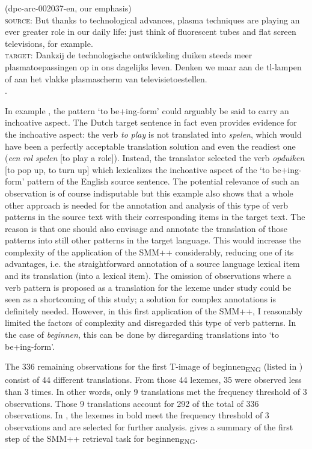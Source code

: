 \ea (dpc-arc-002037-en, our emphasis)\label{ex:3:4}\\
\textsc{source:} But thanks to technological advances, plasma techniques are playing an ever greater role in our daily life: just think of fluorescent tubes and flat screen televisions, for example.\\
\textsc{target:} Dankzij de technologische ontwikkeling duiken steeds meer plasmatoepassingen op in ons dagelijks leven. Denken we maar aan de tl-lampen of aan het vlakke plasmascherm van televisietoestellen.\\.
\z

In example , the pattern ‘to be+ing-form’ could arguably be said to carry an inchoative aspect. The Dutch target sentence in fact even provides evidence for the inchoative aspect: the verb \textit{to} \textit{play} is not translated into \textit{spelen}, which would have been a perfectly acceptable translation solution and even the readiest one (\textit{een} \textit{rol} \textit{spelen} [to play a role]). Instead, the translator selected the verb \textit{opduiken} [to pop up, to turn up] which lexicalizes the inchoative aspect of the ‘to be+ing-form’ pattern of the English source sentence. The potential relevance of such an observation is of course indisputable but this example also shows that a whole other approach is needed for the annotation and analysis of this type of verb patterns in the source text with their corresponding items in the target text. The reason is that one should also envisage and annotate the translation of those patterns into still other patterns in the target language. This would increase the complexity of the application of the SMM++ considerably, reducing one of its advantages, i.e. the straightforward annotation of a source language lexical item and its translation (into a lexical item). The omission of observations where a verb pattern is proposed as a translation for the lexeme under study could be seen as a shortcoming of this study; a solution for complex annotations is definitely needed. However, in this first application of the SMM++, I reasonably limited the factors of complexity and disregarded this type of verb patterns. In the case of \textit{beginnen}, this can be done by disregarding translations into ‘to be+ing-form’.

The 336 remaining observations for the first T-image of beginnen\textsubscript{ENG} (listed in ) consist of 44 different translations. From those 44 lexemes, 35 were observed less than 3 times. In other words, only 9 translations met the frequency threshold of 3 observations. Those 9 translations account for 292 of the total of 336 observations. In , the lexemes in bold meet the frequency threshold of 3 observations and are selected for further analysis.  gives a summary of the first step of the SMM++ retrieval task for beginnen\textsubscript{ENG}.

